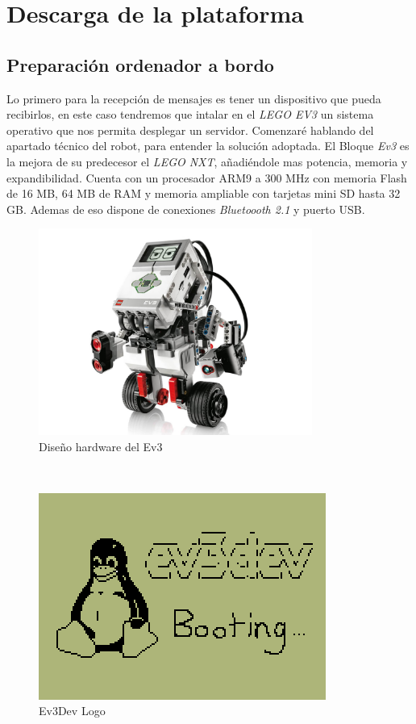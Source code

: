 \section{Descarga de la plataforma}
\subsection{Preparación ordenador a bordo}
Lo primero para la recepción de mensajes es tener un dispositivo que pueda recibirlos, en este caso tendremos que intalar en el \textit{LEGO EV3} un sistema operativo que nos permita desplegar un servidor. Comenzaré hablando del apartado técnico del robot, para entender la solución adoptada. El Bloque \textit{Ev3} es la mejora de su predecesor el \textit{LEGO NXT}, añadiéndole mas potencia, memoria y expandibilidad. Cuenta con un procesador ARM9 a 300 MHz con memoria Flash de 16 MB, 64 MB de RAM y memoria ampliable con tarjetas mini SD hasta 32 GB. Ademas de eso dispone de conexiones \textit{Bluetoooth 2.1} y puerto USB. 
\\
\begin{figure}[h!]
  \centering
    \includegraphics[width=0.8\textwidth]{img/legomind.jpg}
  \caption{Diseño hardware del Ev3}
  \label{Diseño hardware del Ev3}
\end{figure}
\\

\begin{figure}
    \centering
    \includegraphics[width=0.6\linewidth]{img/logo_ev3dev_mono.png}
    \caption{Ev3Dev Logo}
    \label{fig:ev3dev}
\end{figure}

